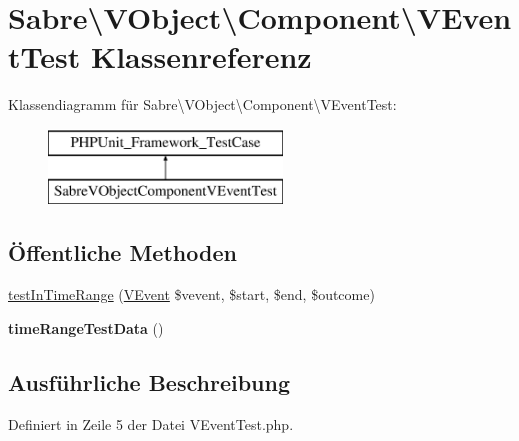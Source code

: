 \hypertarget{class_sabre_1_1_v_object_1_1_component_1_1_v_event_test}{}\section{Sabre\textbackslash{}V\+Object\textbackslash{}Component\textbackslash{}V\+Event\+Test Klassenreferenz}
\label{class_sabre_1_1_v_object_1_1_component_1_1_v_event_test}
Klassendiagramm für Sabre\textbackslash{}V\+Object\textbackslash{}Component\textbackslash{}V\+Event\+Test\+:\begin{figure}[H]
\begin{center}
\leavevmode
\includegraphics[height=2.000000cm]{class_sabre_1_1_v_object_1_1_component_1_1_v_event_test}
\end{center}
\end{figure}
\subsection*{Öffentliche Methoden}
\begin{DoxyCompactItemize}
\item 
\mbox{\hyperlink{class_sabre_1_1_v_object_1_1_component_1_1_v_event_test_ae8d9f453093143fb337f975e0d26b812}{test\+In\+Time\+Range}} (\mbox{\hyperlink{class_sabre_1_1_v_object_1_1_component_1_1_v_event}{V\+Event}} \$vevent, \$start, \$end, \$outcome)
\item 
\mbox{\label{class_sabre_1_1_v_object_1_1_component_1_1_v_event_test_a21f76ba2a7477e3d889d3253291c8204}} 
{\bfseries time\+Range\+Test\+Data} ()
\end{DoxyCompactItemize}


\subsection{Ausführliche Beschreibung}


Definiert in Zeile 5 der Datei V\+Event\+Test.\+php.



